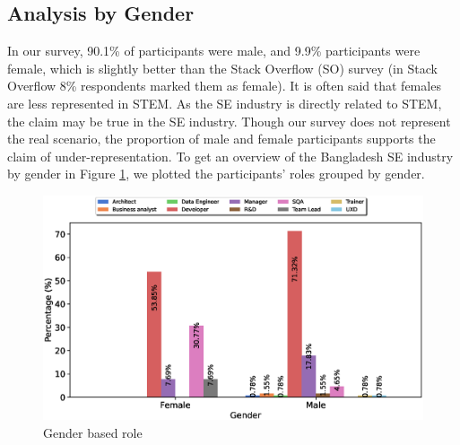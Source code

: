 \subsection{Analysis by Gender}
\label{analysis by gender}

In our survey, 90.1\% of participants were male, and 9.9\% participants were female, which is slightly better than the Stack Overflow (SO) survey \citep{StackoverflowSurvey2017,StackoverflowSurvey2018,StackoverflowSurvey2019,StackoverflowSurvey2020} (in Stack Overflow 8\% respondents marked them as female). It is often said that females are less represented in STEM. As the SE industry is directly related to STEM, the claim may be true in the SE industry. Though our survey does not represent the real scenario, the proportion of male and female participants supports the claim of under-representation. To get an overview of the Bangladesh SE industry by gender in Figure \ref{fig:gender and role}, we plotted the participants' roles grouped by gender. 
\begin{figure}[h]
\centering
 \includegraphics[scale=0.4]{Figures/Gender_and_Role}
 \caption{Gender based role}
 \label{fig:gender and role}
\end{figure}
